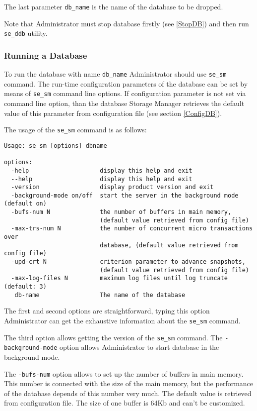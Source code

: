 \documentclass[a4paper,12pt]{article}
\begin{document}
The last parameter \verb!db_name! is the name of the database to be dropped.

Note that Administrator must stop database firstly (see \ref{StopDB}) and then run \verb!se_ddb! utility.

\subsubsection{Running a Database}
\label{RunDB}

To run the database with name \verb!db_name! Administrator should use \verb!se_sm! command. The run-time configuration parameters of the database can be set by means of \verb!se_sm! command line options. If configuration parameter is not set via command line option, than the database Storage Manager retrieves the default value of this parameter from configuration file (see section \ref{ConfigDB}).

The usage of the \verb!se_sm! command is as follows:

\begin{verbatim}
Usage: se_sm [options] dbname

options:
  -help                    display this help and exit
  --help                   display this help and exit
  -version                 display product version and exit
  -background-mode on/off  start the server in the background mode (default on)
  -bufs-num N              the number of buffers in main memory,
                           (default value retrieved from config file)
  -max-trs-num N           the number of concurrent micro transactions over
                           database, (default value retrieved from config file)
  -upd-crt N               criterion parameter to advance snapshots,
                           (default value retrieved from config file)
  -max-log-files N         maximum log files until log truncate (default: 3)
   db-name                 The name of the database
\end{verbatim}

The first and second options are straightforward, typing this option Administrator can get the exhaustive information about the \verb!se_sm! command.

The third option allows getting the version of the \verb!se_sm! command.
The \verb!-background-mode! option allows Administrator to start database in the background mode.

The \verb!-bufs-num! option allows to set up the number of buffers in main memory. This number is connected with the size of the main memory, but the performance of the database depends of this number very much. The default value is retrieved from configuration file. The size of one buffer is 64Kb and can't be customized.
\end{document}
